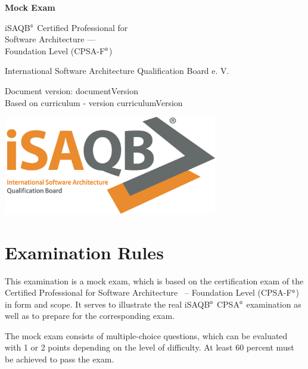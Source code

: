 \documentclass[12pt,a4paper]{article}
\newcounter{examQuestionCount}
\newcounter{examQuestion}\setcounter{examQuestion}{1}
\newcommand{\registered}{$^\textrm{\tiny\textregistered}$}
\begin{document}
\pagestyle{fancy}

\begin{titlepage}
  \begin{center}
   {\huge\bfseries Mock Exam

     iSAQB\registered{} Certified Professional for\\ Software Architecture ---\\[2ex]
     
     Foundation Level (CPSA-F\registered{})}

  \bigskip
  
  {\large International Software Architecture Qualification Board
    e. V.}

  \bigskip

  Document version: {{documentVersion}}\\
  Based on curriculum - version {{curriculumVersion}}
\end{center}

\vspace*{\fill}

\begin{center}
\includegraphics[width=0.7\textwidth]{isaqb-logo}
\end{center}

\end{titlepage}

\section*{Examination Rules}

This examination is a mock exam, which is based on the certification
exam of the Certified Professional for Software Architecture ~--
Foundation Level (CPSA-F\registered{}) in form and scope. It serves to illustrate
the real iSAQB\registered{} CPSA\registered{} examination as well as to prepare for the
corresponding exam.

The mock exam consists of \theexamQuestionCount{} multiple-choice
questions, which can be evaluated with 1 or 2 points depending on the
level of difficulty. At least 60 percent must be achieved to pass the
exam.
\end{document}
